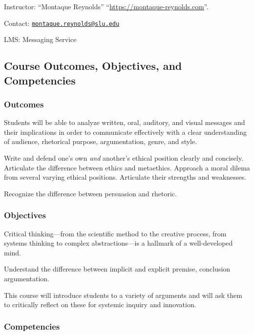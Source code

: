 \documentclass[]{tufte-handout}
\begin{document}
Instructor: ``Montaque Reynolds'' ``\url{https://montaque-reynolds.com}''.

Contact: \href{mailto:montaque.reynolds@slu.edu}{\nolinkurl{montaque.reynolds@slu.edu}}

LMS: Messaging Service

\hypertarget{course-outcomes-objectives-and-competencies}{%
\subsection{Course Outcomes, Objectives, and Competencies}\label{course-outcomes-objectives-and-competencies}}

\hypertarget{outcomes}{%
\subsubsection{Outcomes}\label{outcomes}}

Students will be able to analyze written, oral, auditory, and visual messages and their implications in order to communicate effectively with a clear understanding
of audience, rhetorical purpose, argumentation, genre, and style.

Write and defend one's own \emph{and} another's ethical position clearly and concisely. Articulate the difference between ethics and metaethics. Approach a moral dilema from several varying ethical positions. Articulate their strengths and weaknesses.

Recognize the difference between persuasion and rhetoric.

\hypertarget{objectives}{%
\subsubsection{Objectives}\label{objectives}}

Critical thinking---from the scientific method to the creative process, from
systems thinking to complex abstractions---is a hallmark of a well-developed
mind.

Understand the difference between implicit and explicit premise, conclusion argumentation.

This course will introduce students to a variety of arguments and will ask them to critically reflect on these for systemic inquiry
and innovation.

\hypertarget{competencies}{%
\subsubsection{Competencies}\label{competencies}}
\end{document}
